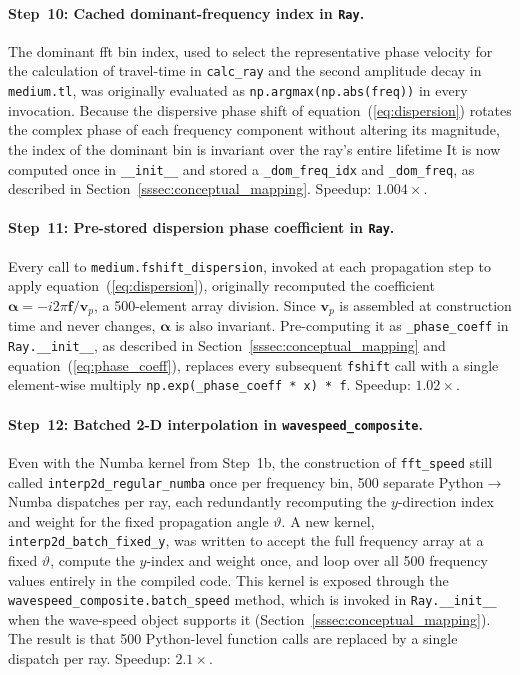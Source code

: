             \paragraph*{Step~10: Cached dominant-frequency index in \texttt{Ray}.}
            The dominant \acrshort{fft} bin index, used to select the representative phase velocity for the calculation of travel-time in \texttt{calc\_ray} and the second amplitude decay in \texttt{medium.tl}, was originally evaluated as \texttt{np.argmax(np.abs(freq))} in every invocation. Because the dispersive phase shift of equation~(\ref{eq:dispersion}) rotates the complex phase of each frequency component without altering its magnitude, the index of the dominant bin is invariant over the ray's entire lifetime It is now computed once in \texttt{\_\_init\_\_} and stored a \texttt{\_dom\_freq\_idx} and \texttt{\_dom\_freq}, as described in Section~\ref{sssec:conceptual_mapping}.  Speedup: $1.004\times$.

            \paragraph*{Step~11: Pre-stored dispersion phase coefficient in \texttt{Ray}.}
            Every call to \texttt{medium.fshift\_dispersion}, invoked at each propagation step to apply equation~(\ref{eq:dispersion}), originally recomputed the coefficient $\boldsymbol{\alpha} = -i 2\pi\mathbf{f}/ \mathbf{v}_p$, a 500-element array division. Since $\mathbf{v}_p$ is assembled at construction time and never changes, $\boldsymbol{\alpha}$ is also invariant. Pre-computing it as \texttt{\_phase\_coeff} in \texttt{Ray.\_\_init\_\_}, as described in Section~\ref{sssec:conceptual_mapping} and equation~(\ref{eq:phase_coeff}), replaces every subsequent \texttt{fshift} call with a single element-wise multiply \texttt{np.exp(\_phase\_coeff * x) * f}.  Speedup: $1.02\times$.

            \paragraph*{Step~12: Batched 2-D interpolation in \texttt{wavespeed\_composite}.}
            Even with the Numba kernel from Step~1b, the construction of \texttt{fft\_speed} still called \texttt{interp2d\_regular\_numba} once per frequency bin, 500 separate Python$\to$Numba dispatches per ray, each redundantly recomputing the $y$-direction index and weight for the fixed propagation angle $\vartheta$. A new kernel, \texttt{interp2d\_batch\_fixed\_y}, was written to accept the full frequency array at a fixed $\vartheta$, compute the $y$-index and weight once, and loop over all 500 frequency values entirely in the compiled code. This kernel is exposed through the \texttt{wavespeed\_composite.batch\_speed} method, which is invoked in \texttt{Ray.\_\_init\_\_} when the wave-speed object supports it (Section~\ref{sssec:conceptual_mapping}). The result is that 500 Python-level function calls are replaced by a single dispatch per ray. Speedup: $2.1\times$.

